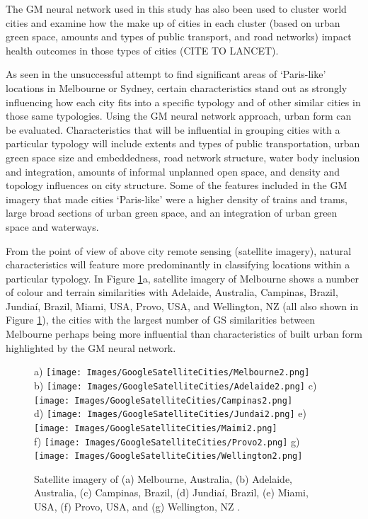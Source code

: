 \documentclass[sageh,times]{sagej}
\begin{document}
The GM neural network used in this study has also been used to cluster world cities and examine how the make up of cities in each cluster (based on urban green space, amounts and types of public transport, and road networks) impact health outcomes in those types of cities (CITE TO LANCET). 

As seen in the unsuccessful attempt to find significant areas of `Paris-like' locations in Melbourne or Sydney, certain characteristics stand out as strongly influencing how each city fits into a specific typology and of other similar cities in those same typologies. Using the GM neural network approach, urban form can be evaluated. Characteristics that will be influential in grouping cities with a particular typology will include extents and types of public transportation, urban green space size and embeddedness, road network structure, water body inclusion and integration, amounts of informal unplanned open space, and density and topology influences on city structure. Some of the features included in the GM imagery that made cities `Paris-like' were a higher density of trains and trams, large broad sections of urban green space, and an integration of urban green space and waterways.


From the point of view of above city remote sensing (satellite imagery), natural characteristics will feature more predominantly in classifying locations within a particular typology. In Figure \ref{fig:satimages}a, satellite imagery of Melbourne shows a number of colour and terrain similarities with Adelaide, Australia, Campinas, Brazil, Jundia\'{i}, Brazil, Miami, USA, Provo, USA, and Wellington, NZ (all also shown in Figure \ref{fig:satimages}), the cities with the largest number of GS similarities between Melbourne perhaps being more influential than characteristics of built urban form highlighted by the GM neural network.




\begin{figure}[!htbp]
\centering    
a) \texttt{[image: Images/GoogleSatelliteCities/Melbourne2.png]} 
\\ b) \texttt{[image: Images/GoogleSatelliteCities/Adelaide2.png]} 
c) \texttt{[image: Images/GoogleSatelliteCities/Campinas2.png]} 
\\ d) \texttt{[image: Images/GoogleSatelliteCities/Jundai2.png]} 
e) \texttt{[image: Images/GoogleSatelliteCities/Maimi2.png]} 
\\ f) \texttt{[image: Images/GoogleSatelliteCities/Provo2.png]} 
g) \texttt{[image: Images/GoogleSatelliteCities/Wellington2.png]} 
 \caption{Satellite imagery of (a) Melbourne, Australia, (b) Adelaide, Australia, (c) Campinas, Brazil, (d) Jundia\'{i}, Brazil, (e) Miami, USA, (f) Provo, USA, and (g) Wellington, NZ \citep{GoogleStatic2017}.}    
 \label{fig:satimages}  
\end{figure} 
\end{document}
